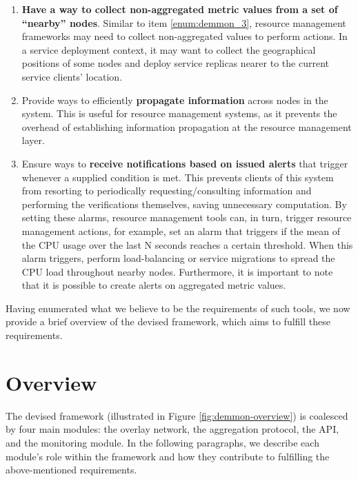 \begin{enumerate}
    \item \textbf{Have a way to collect non-aggregated metric values from a set of ``nearby'' nodes}. Similar to item \ref{enum:demmon_3}, resource management frameworks may need to collect non-aggregated values to perform actions. In a service deployment context, it may want to collect the geographical positions of some nodes and deploy service replicas nearer to the current service clients' location. \label{enum:demmon_7}
    
    \item Provide ways to efficiently \textbf{propagate information} across nodes in the system. This is useful for resource management systems, as it prevents the overhead of establishing information propagation at the resource management layer. \label{enum:demmon_5}
    
    \item Ensure ways to \textbf{receive notifications based on issued alerts} that trigger whenever a supplied condition is met. This prevents clients of this system from resorting to periodically requesting/consulting information and performing the verifications themselves, saving unnecessary computation. By setting these alarms, resource management tools can, in turn, trigger resource management actions, for example, set an alarm that triggers if the mean of the CPU usage over the last N seconds reaches a certain threshold. When this alarm triggers, perform load-balancing or service migrations to spread the CPU load throughout nearby nodes. Furthermore, it is important to note that it is possible to create alerts on aggregated metric values. \label{enum:demmon_6}
    
\end{enumerate}

Having enumerated what we believe to be the requirements of such tools, we now provide a brief overview of the devised framework, which aims to fulfill these requirements. 

\section{Overview}
\label{sec:framework_overview}

The devised framework (illustrated in Figure \ref{fig:demmon-overview}) is coalesced by four main modules: the overlay network, the aggregation protocol, the API, and the monitoring module. In the following paragraphs, we describe each module's role within the framework and how they contribute to fulfilling the above-mentioned requirements.

